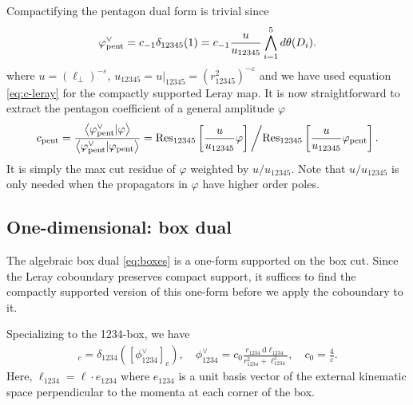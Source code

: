 \documentclass[11pt]{article}
\renewcommand{\d}{\text{d}}
\newcommand{\be}{\begin{equation}}
\newcommand{\ee}{\end{equation}}
\newcommand{\res}{{\rm Res}}
\newcommand{\pent}{{\rm pent}}
\newcommand{\vphi}{\varphi}
\newcommand{\vep}{\varepsilon}
\renewcommand{\th}{\theta}
\newcommand{\ipaa}[2]{\left\langle #1 \vert #2 \right\rangle}
\begin{document}
Compactifying the pentagon dual form is trivial since 
\be
	\vphi^\vee_\pent 
	= c_{-1} \delta_{12345}(1) 
	= c_{-1} \frac{u}{u_{12345}} \bigwedge_{i=1}^5 d\th(D_i).
\ee
where $u = (\ell_\perp)^{-\vep}$, $u_{12345} = u\vert_{12345} = (r_{12345}^2)^{-\vep}$ and we have used equation \eqref{eq:c-leray} for the compactly supported Leray map. It is now straightforward to extract the pentagon coefficient of a general amplitude $\vphi$
\be
	c_\pent 
	= \frac{ \ipaa{\vphi^\vee_\pent}{\vphi} }{ \ipaa{\vphi^\vee_\pent}{\vphi_\pent}}
	= \res_{12345} \left[ \frac{u}{u_{12345}} \vphi \right] \bigg\slash \res_{12345} \left[ \frac{u}{u_{12345}} \vphi_\pent \right]. 
\ee
It is simply the max cut residue of $\vphi$ weighted by $u/u_{12345}$. Note that $u/u_{12345}$ is only needed when the propagators
in $\vphi$ have higher order poles.

\subsection{One-dimensional: box dual \label{sec:cbox}}

The algebraic box dual \eqref{eq:boxes} is a one-form supported on the box cut.
Since the Leray coboundary preserves compact support, it suffices to find the compactly supported version of this one-form
before we apply the coboundary to it.

Specializing to the 1234-box, we have 
\begin{align}
	[\vphi^\vee_{1234}]_c = \delta_{1234}([\phi_{1234}^\vee]_c),
	\quad 
	\phi_{1234}^\vee = c_0 \frac{r_{1234}\ \d\ell_{1234}}{r_{1234}^2 + \ell_{1234}^2},
	\quad 
	c_0 = \frac{4}{\vep}.
\end{align}
Here, $\ell_{1234} = \ell \cdot e_{1234}$ where $e_{1234}$ is a unit basis vector of the external kinematic space perpendicular to
the momenta at each corner of the box.
\end{document}
